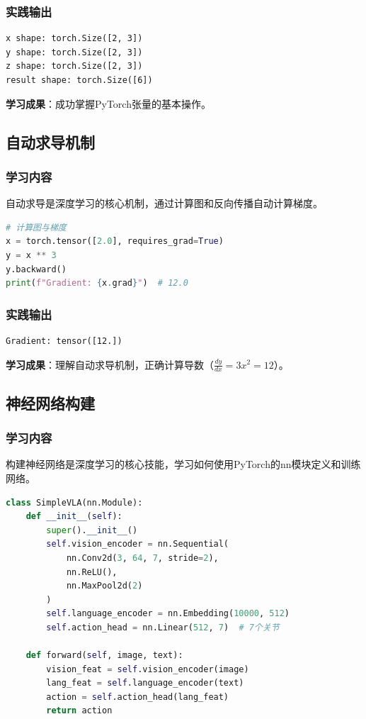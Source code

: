 \documentclass[12pt,a4paper]{article}
\begin{document}
\subsubsection{实践输出}

\begin{verbatim}
x shape: torch.Size([2, 3])
y shape: torch.Size([2, 3])
z shape: torch.Size([2, 3])
result shape: torch.Size([6])
\end{verbatim}

\textbf{学习成果}：成功掌握PyTorch张量的基本操作。

\subsection{自动求导机制}

\subsubsection{学习内容}

自动求导是深度学习的核心机制，通过计算图和反向传播自动计算梯度。

\begin{lstlisting}[language=Python]
# 计算图与梯度
x = torch.tensor([2.0], requires_grad=True)
y = x ** 3
y.backward()
print(f"Gradient: {x.grad}")  # 12.0
\end{lstlisting}

\subsubsection{实践输出}

\begin{verbatim}
Gradient: tensor([12.])
\end{verbatim}

\textbf{学习成果}：理解自动求导机制，正确计算导数（$\frac{dy}{dx} = 3x^2 = 12$）。

\subsection{神经网络构建}

\subsubsection{学习内容}

构建神经网络是深度学习的核心技能，学习如何使用PyTorch的nn模块定义和训练网络。

\begin{lstlisting}[language=Python]
class SimpleVLA(nn.Module):
    def __init__(self):
        super().__init__()
        self.vision_encoder = nn.Sequential(
            nn.Conv2d(3, 64, 7, stride=2),
            nn.ReLU(),
            nn.MaxPool2d(2)
        )
        self.language_encoder = nn.Embedding(10000, 512)
        self.action_head = nn.Linear(512, 7)  # 7个关节
    
    def forward(self, image, text):
        vision_feat = self.vision_encoder(image)
        lang_feat = self.language_encoder(text)
        action = self.action_head(lang_feat)
        return action
\end{lstlisting}
\end{document}
